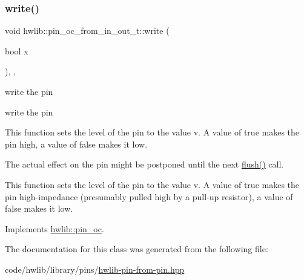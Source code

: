 \mbox{\label{classhwlib_1_1pin__oc__from__in__out__t_a5bd43e42810402353b4e902579055ef0}} 
\subsubsection{\texorpdfstring{write()}{write()}}
{\footnotesize\ttfamily void hwlib\+::pin\+\_\+oc\+\_\+from\+\_\+in\+\_\+out\+\_\+t\+::write (\begin{DoxyParamCaption}\item[{bool}]{x }\end{DoxyParamCaption})\hspace{0.3cm}{\ttfamily [inline]}, {\ttfamily [override]}, {\ttfamily [virtual]}}





write the pin

write the pin

This function sets the level of the pin to the value v. A value of true makes the pin high, a value of false makes it low.

The actual effect on the pin might be postponed until the next \hyperlink{classhwlib_1_1pin__oc__from__in__out__t_add08ce2c564c20a9aea9bac915123929}{flush()} call.

This function sets the level of the pin to the value v. A value of true makes the pin high-\/impedance (presumably pulled high by a pull-\/up resistor), a value of false makes it low. 

Implements \hyperlink{classhwlib_1_1pin__oc_a4429dd7dc80858a213bb157f4ac5def3}{hwlib\+::pin\+\_\+oc}.



The documentation for this class was generated from the following file\+:\begin{DoxyCompactItemize}
\item 
code/hwlib/library/pins/\hyperlink{hwlib-pin-from-pin_8hpp}{hwlib-\/pin-\/from-\/pin.\+hpp}\end{DoxyCompactItemize}
